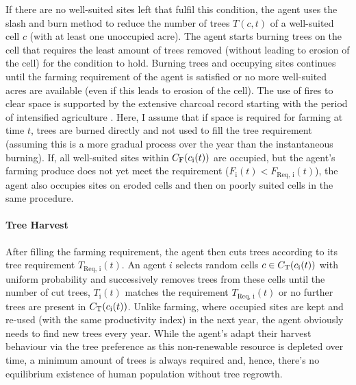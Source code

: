 If there are no well-suited sites left that fulfil this condition, the agent uses the slash and burn method to reduce the number of trees $T(c,t)$ of a well-suited cell $c$ (with at least one unoccupied acre).
The agent starts burning trees on the cell that requires the least amount of trees removed (without leading to erosion of the cell) for the condition to hold.
Burning trees and occupying sites continues until the farming requirement of the agent is satisfied or no more well-suited acres are available (even if this leads to erosion of the cell).
The use of fires to clear space is supported by the extensive charcoal record starting with the period of intensified agriculture \citep{Mieth2015}. 
Here, I assume that if space is required for farming at time $t$, trees are burned directly and not used to fill the tree requirement (assuming this is a more gradual process over the year than the instantaneous burning).
If, all well-suited sites within $C_{\rm F}(c_{\rm i}(t))$ are occupied, but the agent's farming produce does not yet meet the requirement ($F_\text{i}(t)<F_\text{Req, i}(t)$), the agent also occupies sites on eroded cells and then on poorly suited cells in the same procedure.

\paragraph{Tree Harvest}
After filling the farming requirement, the agent then cuts trees according to its tree requirement $T_\text{Req, i}(t)$.
An agent $i$ selects random cells $c\in C_{\rm T}(c_{\rm i}(t))$ with uniform probability and successively removes trees from these cells until the number of cut trees, $T_\text{i}(t)$ matches the requirement $T_\text{Req, i}(t)$ or no further trees are present in $ C_{\rm T}(c_{\rm i}(t))$. 
Unlike farming, where occupied sites are kept and re-used (with the same productivity index) in the next year, the agent obviously needs to find new trees every year.
While the agent's adapt their harvest behaviour via the tree preference as this non-renewable resource is depleted over time, a minimum amount of trees is always required and, hence, there's no equilibrium existence of human population without tree regrowth.

